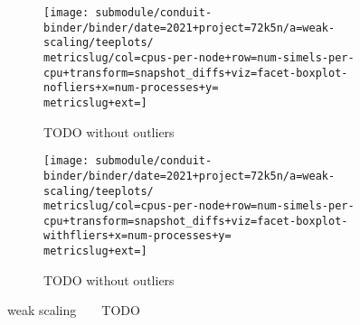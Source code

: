 \begin{figure*}
  \centering
  \begin{subfigure}[b]{0.5\textwidth}
    \centering
    \texttt{[image: submodule/conduit-binder/binder/date=2021+project=72k5n/a=weak-scaling/teeplots/\\metricslug/col=cpus-per-node+row=num-simels-per-cpu+transform=snapshot\_diffs+viz=facet-boxplot-nofliers+x=num-processes+y=\\metricslug+ext=]}
    \caption{%
      TODO without outliers}
    \label{fig:weak-scaling-distribution-\metricslug-nofliers}
  \end{subfigure}
  \begin{subfigure}[b]{0.5\textwidth}
    \centering
    \texttt{[image: submodule/conduit-binder/binder/date=2021+project=72k5n/a=weak-scaling/teeplots/\\metricslug/col=cpus-per-node+row=num-simels-per-cpu+transform=snapshot\_diffs+viz=facet-boxplot-withfliers+x=num-processes+y=\\metricslug+ext=]}
    \caption{%
      TODO without outliers}
    \label{fig:weak-scaling-distribution-\metricslug-withfliers}
  \end{subfigure}
  \caption{%
    weak scaling ~ \metric ~ TODO}
  \label{fig:weak-scaling-distribution-\metricslug}
\end{figure*}
